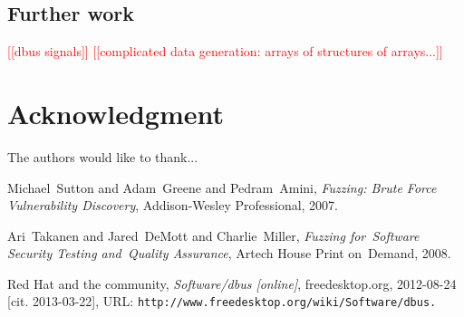 \documentclass[conference]{IEEEtran}
\newcommand{\addtodo}[1]{\textcolor{red}{[[#1]]}}
\begin{document}
\subsection{Further work}
\addtodo{dbus signals}
\addtodo{complicated data generation: arrays of structures of arrays...}

\section*{Acknowledgment}

The authors would like to thank...




%
%
%
\begin{thebibliography}{1}

Michael~Sutton and Adam~Greene and Pedram~Amini, \emph{Fuzzing: Brute Force
Vulnerability Discovery}, Addison-Wesley Professional, 2007.

Ari~Takanen and Jared~DeMott and Charlie~Miller, \emph{Fuzzing for~Software
Security Testing and~Quality Assurance}, Artech House Print on~Demand, 2008.

Red Hat and the community, \emph{Software/dbus [online]}, freedesktop.org,
2012-08-24 [cit. 2013-03-22], URL: \tt http://www.freedesktop.org/wiki/Software/dbus.

\end{thebibliography}

\end{document}
